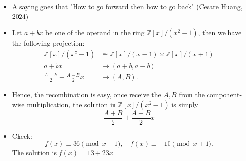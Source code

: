 \begin{frame}
    \begin{itemize}
        \item A saying goes that "How to go forward then how to go back" (Cesare Huang, 2024)
        \item Let \(a + b x\) be one of the operand in the ring \( \mathbb{Z}[x]/ (x^{2}-1)\),
            then we have the following projection:
            \begin{align*}
                \mathbb{Z}[x] / (x^{2}-1) &\cong 
                \mathbb{Z}[x] / (x-1) \times 
                \mathbb{Z}[x] / (x+1)  \\
                a + b x &\mapsto (a+b, a-b)\\
                \frac{A+B}{2} + \frac{A-B}{2}x &\mapsto (A,B).
            \end{align*}

        \item Hence, the recombination is easy, once receive the \(A,B\) from the component-wise multiplication, 
              the solution in \( \mathbb{Z}[x] / (x^{2} - 1) \) is simply
              \[
                \frac{A+B}{2} + \frac{A-B}{2}x
              \]

        \item Check:
          \[
            f(x) \equiv 36 \pmod{x-1},\quad 
            f(x) \equiv -10 \pmod{x+1}.
          \]
          The solution is \(f(x) = 13 + 23 x\).
    \end{itemize}
\end{frame}

